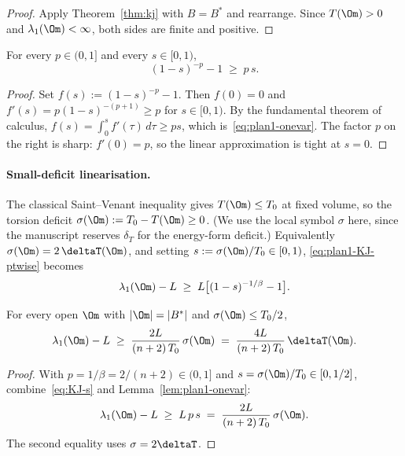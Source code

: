 \begin{proof}
Apply Theorem~\ref{thm:kj} with $B=B^*$ and rearrange. Since $T(\Om)>0$
and $\lambda_1(\Om)<\infty$, both sides are finite and positive.
\end{proof}

\begin{lemma}\label{lem:plan1-onevar}
For every $p\in(0,1]$ and every $s\in[0,1)$,
\begin{equation}\label{eq:plan1-onevar}
(1-s)^{-p}-1 \;\ge\; p\,s.
\end{equation}
\end{lemma}

\begin{proof}
Set $f(s):=(1-s)^{-p}-1$. Then $f(0)=0$ and
$f'(s)=p(1-s)^{-(p+1)}\ge p$ for $s\in[0,1)$. By the fundamental
theorem of calculus,
$f(s)=\int_0^s f'(\tau)\,d\tau\ge ps$, which is~\eqref{eq:plan1-onevar}.
The factor $p$ on the right is sharp: $f'(0)=p$, so the linear
approximation is tight at $s=0$.
\end{proof}

\paragraph{Small-deficit linearisation.} The classical Saint--Venant
inequality gives $T(\Om)\le T_0$ at fixed volume, so the torsion
deficit $\sigma(\Om):=T_0-T(\Om)\ge 0$. (We use the local symbol
$\sigma$ here, since the manuscript reserves $\delta_T$ for the
energy-form deficit.) Equivalently
$\sigma(\Om)=2\,\deltaT(\Om)$, and setting
$s:=\sigma(\Om)/T_0\in[0,1)$, \eqref{eq:plan1-KJ-ptwise} becomes
\begin{equation}\label{eq:KJ-s}
\lambda_1(\Om)-L \;\ge\; L\bigl[(1-s)^{-1/\beta}-1\bigr].
\end{equation}

\begin{lemma}\label{lem:KJ-linear}
For every open $\Om$ with $|\Om|=|B^*|$ and $\sigma(\Om)\le T_0/2$,
\begin{equation}\label{eq:plan1-KJ-linear}
\lambda_1(\Om)-L
\;\ge\; \frac{2L}{(n+2)\,T_0}\,\sigma(\Om)
\;=\; \frac{4L}{(n+2)\,T_0}\,\deltaT(\Om).
\end{equation}
\end{lemma}

\begin{proof}
With $p=1/\beta=2/(n+2)\in(0,1]$ and $s=\sigma(\Om)/T_0\in[0,1/2]$,
combine~\eqref{eq:KJ-s} and Lemma~\ref{lem:plan1-onevar}:
\[
\lambda_1(\Om)-L
\;\ge\; L\,p\,s
\;=\; \frac{2L}{(n+2)\,T_0}\,\sigma(\Om).
\]
The second equality uses $\sigma=2\deltaT$.
\end{proof}

